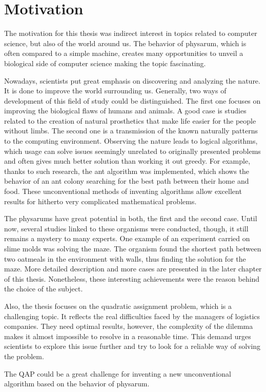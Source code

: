 \section{Motivation}
\label{section:introduction_motivation}

The motivation for this thesis was indirect interest in topics related to computer science, but also of the world around us. The behavior of physarum, which is often compared to a simple machine, creates many opportunities to unveil a biological side of computer science making the topic fascinating.

Nowadays, scientists put great emphasis on discovering and analyzing the nature. It is done to improve the world surrounding us. Generally, two ways of development of this field of study could be distinguished. The first one focuses on improving the biological flaws of humans and animals. A good case is studies related to the creation of natural prosthetics that make life easier for the people without limbs. The second one is a transmission of the known naturally patterns to the computing environment. Observing the nature leads to logical algorithms, which usage can solve issues seemingly unrelated to originally presented problems and often gives much better solution than working it out greedy. For example, thanks to such research, the ant algorithm was implemented, which shows the behavior of an ant colony searching for the best path between their home and food. These unconventional methods of inventing algorithms allow excellent results for hitherto very complicated mathematical problems.

The physarums have great potential in both, the first and the second case. Until now, several studies linked to these organisms were conducted, though, it still remains a mystery to many experts. One example of an experiment carried on slime molds was solving the maze. The organism found the shortest path between two oatmeals in the environment with walls, thus finding the solution for the maze. More detailed description and more cases are presented in the later chapter of this thesis. Nonetheless, these interesting achievements were the reason behind the choice of the subject.

Also, the thesis focuses on the quadratic assignment problem, which is a challenging topic. It reflects the real difficulties faced by the managers of logistics companies. They need optimal results, however, the complexity of the dilemma makes it almost impossible to resolve in a reasonable time. This demand urges scientists to explore this issue further and try to look for a reliable way of solving the problem. 

The QAP could be a great challenge for inventing a new unconventional algorithm based on the behavior of physarum. 